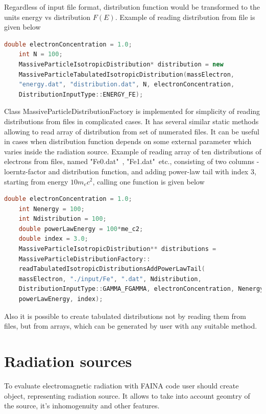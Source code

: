 Regardless of input file format, distribution function would be transformed to the units energy vs distribution $F(E)$. Example of reading distribution from file is given below

\begin{lstlisting}[language=c++]
	double electronConcentration = 1.0;
	int N = 100;
	MassiveParticleIsotropicDistribution* distribution = new
	MassiveParticleTabulatedIsotropicDistribution(massElectron,
	"energy.dat", "distribution.dat", N, electronConcentration,
	DistributionInputType::ENERGY_FE);
\end{lstlisting}

Class MassiveParticleDistributionFactory is implemented for simplicity of reading distributions from files in complicated cases. It has several similar static methods allowing to read array of distribution from set of numerated files. It can be useful in cases when distribution function depends on some external parameter which varies inside the radiation source. Example of reading array of ten distributions of electrons from files, named "Fe0.dat"\ , "Fe1.dat"\ etc., consisting of two columns - loerntz-factor and distribution function, and adding power-law tail with index 3, starting from energy $10 m_e c^2$, calling one function is given below

\begin{lstlisting}[language=c++]
	double electronConcentration = 1.0;
	int Nenergy = 100;
	int Ndistribution = 100;
	double powerLawEnergy = 100*me_c2;
	double index = 3.0;
	MassiveParticleIsotropicDistribution** distributions = 
	MassiveParticleDistributionFactory::
	readTabulatedIsotropicDistributionsAddPowerLawTail(
	massElectron, "./input/Fe", ".dat", Ndistribution, 
	DistributionInputType::GAMMA_FGAMMA, electronConcentration, Nenergy,
	powerLawEnergy, index);
\end{lstlisting}

Also it is possible to create tabulated distributions not by reading them from files, but from arrays, which can be generated by user with any suitable method.

\section{Radiation sources}

To evaluate electromagnetic radiation with FAINA code user should create object, representing radiation source. It allows to take into account geomtry of the source, it's inhomogenuity and other features.

